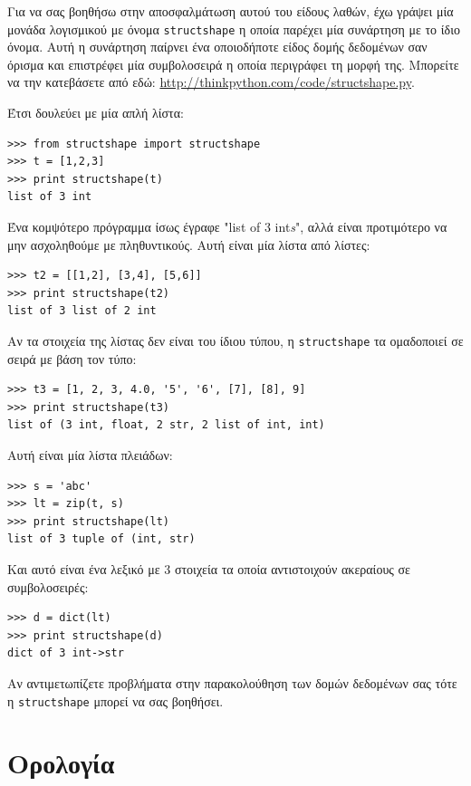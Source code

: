 \documentclass[10pt]{book}
\begin{document}

Για να σας βοηθήσω στην αποσφαλμάτωση αυτού του είδους λαθών, έχω γράψει μία μονάδα λογισμικού με όνομα {\tt structshape} η οποία παρέχει μία συνάρτηση με το ίδιο όνομα. Αυτή η συνάρτηση παίρνει ένα οποιοδήποτε είδος δομής δεδομένων σαν όρισμα και επιστρέφει μία συμβολοσειρά η οποία περιγράφει τη μορφή της. Μπορείτε να την κατεβάσετε από εδώ: \url{http://thinkpython.com/code/structshape.py}.

Έτσι δουλεύει με μία απλή λίστα:

\begin{verbatim}
>>> from structshape import structshape
>>> t = [1,2,3]
>>> print structshape(t)
list of 3 int
\end{verbatim}
%
Ένα κομψότερο πρόγραμμα ίσως έγραφε "list of 3 int{\em s}", αλλά είναι προτιμότερο να μην ασχοληθούμε με πληθυντικούς. Αυτή είναι μία λίστα από λίστες:

\begin{verbatim}
>>> t2 = [[1,2], [3,4], [5,6]]
>>> print structshape(t2)
list of 3 list of 2 int
\end{verbatim}
%
Αν τα στοιχεία της λίστας δεν είναι του ίδιου τύπου, η {\tt structshape} τα ομαδοποιεί σε σειρά με βάση τον τύπο:

\begin{verbatim}
>>> t3 = [1, 2, 3, 4.0, '5', '6', [7], [8], 9]
>>> print structshape(t3)
list of (3 int, float, 2 str, 2 list of int, int)
\end{verbatim}
%
Αυτή είναι μία λίστα πλειάδων:

\begin{verbatim}
>>> s = 'abc'
>>> lt = zip(t, s)
>>> print structshape(lt)
list of 3 tuple of (int, str)
\end{verbatim}
%
Και αυτό είναι ένα λεξικό με 3 στοιχεία τα οποία αντιστοιχούν ακεραίους σε συμβολοσειρές:

\begin{verbatim}
>>> d = dict(lt)
>>> print structshape(d)
dict of 3 int->str
\end{verbatim}
%
Αν αντιμετωπίζετε προβλήματα στην παρακολούθηση των δομών δεδομένων σας τότε η {\tt structshape} μπορεί να σας βοηθήσει.



\section{Ορολογία}
\end{document}
